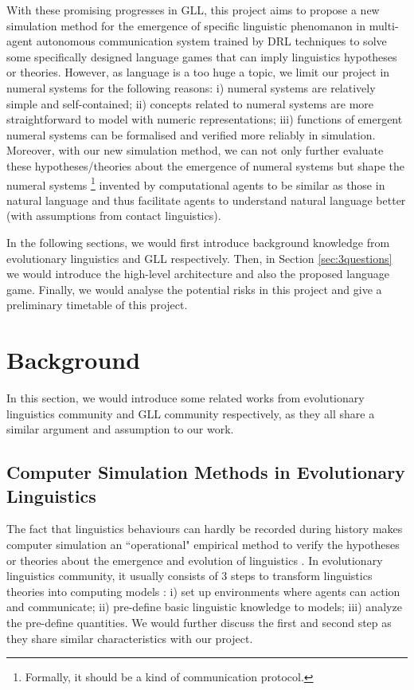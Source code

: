 \documentclass[a4paper,11pt]{article}
\begin{document}
With these promising progresses in GLL, this project aims to propose a new simulation method for the emergence of specific linguistic phenomanon in multi-agent autonomous communication system trained by DRL techniques to solve some specifically designed language games that can imply linguistics hypotheses or theories. However, as language is a too huge a topic, we limit our project in numeral systems for the following reasons: i) numeral systems are relatively simple and self-contained\cite{james1999numeral}; ii) concepts related to numeral systems are more straightforward to model with numeric representations; iii) functions of emergent numeral systems can be formalised and verified more reliably in simulation. Moreover, with our new simulation method, we can not only further evaluate these hypotheses/theories about the emergence of numeral systems but shape the numeral systems \footnote{Formally, it should be a kind of communication protocol.} invented by computational agents to be similar as those in natural language and thus facilitate agents to understand natural language better (with assumptions from contact linguistics).

In the following sections, we would first introduce background knowledge from evolutionary linguistics and GLL respectively. Then, in Section \ref{sec:3questions} we would introduce the high-level architecture and also the proposed language game. Finally, we would analyse the potential risks in this project and give a preliminary timetable of this project.


\section{Background}
\label{sec:2background}

In this section, we would introduce some related works from evolutionary linguistics community and GLL community respectively, as they all share a similar argument and assumption to our work.

\subsection{Computer Simulation Methods in Evolutionary Linguistics}
\label{ssec:2.1simulation_in_EL}

The fact that linguistics behaviours can hardly be recorded during history \cite{lieberman2006toward} makes computer simulation an ``operational" empirical method to verify the hypotheses or theories about the emergence and evolution of linguistics \cite{parisi2007emergence}. In evolutionary linguistics community, it usually consists of 3 steps to transform linguistics theories into computing models \cite{gong2013computer}: i) set up environments where agents can action and communicate; ii) pre-define basic linguistic knowledge to models; iii) analyze the pre-define quantities. We would further discuss the first and second step as they share similar characteristics with our project.
\end{document}
